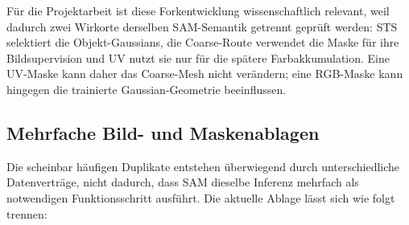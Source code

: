 Für die Projektarbeit ist diese Forkentwicklung wissenschaftlich relevant,
weil dadurch zwei Wirkorte derselben SAM-Semantik getrennt geprüft werden:
STS selektiert die Objekt-Gaussians, die Coarse-Route verwendet die Maske für
ihre Bildsupervision und UV nutzt sie nur für die spätere Farbakkumulation.
Eine UV-Maske kann daher das Coarse-Mesh nicht verändern; eine RGB-Maske kann
hingegen die trainierte Gaussian-Geometrie beeinflussen.

\subsection{Mehrfache Bild- und Maskenablagen}

Die scheinbar häufigen Duplikate entstehen überwiegend durch unterschiedliche
Datenverträge, nicht dadurch, dass SAM dieselbe Inferenz mehrfach als
notwendigen Funktionsschritt ausführt. Die aktuelle Ablage lässt sich wie folgt
trennen:

